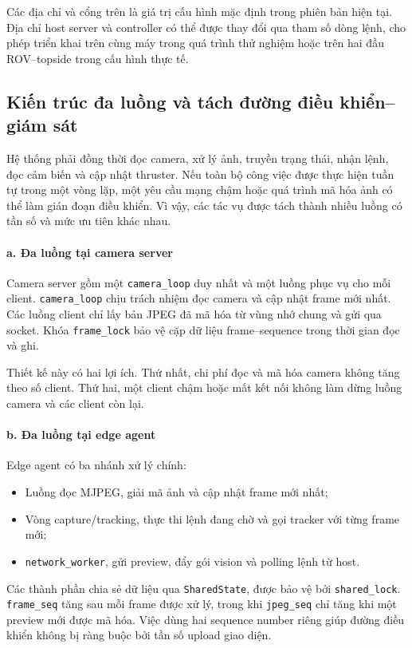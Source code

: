 \documentclass[../DoAn.tex]{subfiles}
\begin{document}
Các địa chỉ và cổng trên là giá trị cấu hình mặc định trong phiên bản hiện tại. Địa chỉ host server và controller có thể được thay đổi qua tham số dòng lệnh, cho phép triển khai trên cùng máy trong quá trình thử nghiệm hoặc trên hai đầu ROV--topside trong cấu hình thực tế.

\subsection{Kiến trúc đa luồng và tách đường điều khiển--giám sát}

Hệ thống phải đồng thời đọc camera, xử lý ảnh, truyền trạng thái, nhận lệnh, đọc cảm biến và cập nhật thruster. Nếu toàn bộ công việc được thực hiện tuần tự trong một vòng lặp, một yêu cầu mạng chậm hoặc quá trình mã hóa ảnh có thể làm gián đoạn điều khiển. Vì vậy, các tác vụ được tách thành nhiều luồng có tần số và mức ưu tiên khác nhau.

\paragraph{a. Đa luồng tại camera server}
Camera server gồm một \texttt{camera\_loop} duy nhất và một luồng phục vụ cho mỗi client. \texttt{camera\_loop} chịu trách nhiệm đọc camera và cập nhật frame mới nhất. Các luồng client chỉ lấy bản JPEG đã mã hóa từ vùng nhớ chung và gửi qua socket. Khóa \texttt{frame\_lock} bảo vệ cặp dữ liệu frame--sequence trong thời gian đọc và ghi.

Thiết kế này có hai lợi ích. Thứ nhất, chi phí đọc và mã hóa camera không tăng theo số client. Thứ hai, một client chậm hoặc mất kết nối không làm dừng luồng camera và các client còn lại.

\paragraph{b. Đa luồng tại edge agent}
Edge agent có ba nhánh xử lý chính:
\begin{itemize}
    \item Luồng đọc MJPEG, giải mã ảnh và cập nhật frame mới nhất;
    \item Vòng capture/tracking, thực thi lệnh đang chờ và gọi tracker với từng frame mới;
    \item \texttt{network\_worker}, gửi preview, đẩy gói vision và polling lệnh từ host.
\end{itemize}

Các thành phần chia sẻ dữ liệu qua \texttt{SharedState}, được bảo vệ bởi \texttt{shared\_lock}. \texttt{frame\_seq} tăng sau mỗi frame được xử lý, trong khi \texttt{jpeg\_seq} chỉ tăng khi một preview mới được mã hóa. Việc dùng hai sequence number riêng giúp đường điều khiển không bị ràng buộc bởi tần số upload giao diện.
\end{document}
